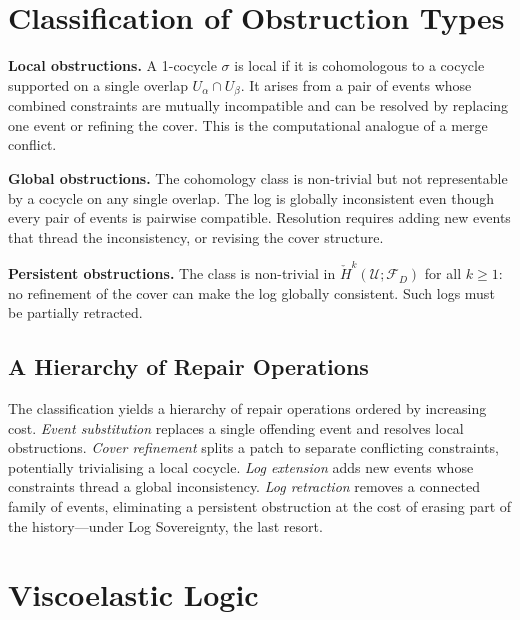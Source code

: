 \documentclass[12pt,oneside]{article}
\theoremstyle{plain}
\theoremstyle{definition}
\theoremstyle{remark}
\newcommand{\Sh}{\mathcal{F}}
\newcommand{\D}{D}
\newcommand{\Hcheck}{\check{H}}
\begin{document}
\section{Classification of Obstruction Types}
\label{sec:classification}

\noindent\textbf{Local obstructions.} A 1-cocycle $\sigma$ is local if it is
cohomologous to a cocycle supported on a single overlap $U_\alpha \cap U_\beta$.
It arises from a pair of events whose combined constraints are mutually
incompatible and can be resolved by replacing one event or refining the cover.
This is the computational analogue of a merge conflict.

\medskip\noindent\textbf{Global obstructions.} The cohomology class is
non-trivial but not representable by a cocycle on any single overlap. The log is
globally inconsistent even though every pair of events is pairwise compatible.
Resolution requires adding new events that thread the inconsistency, or revising
the cover structure.

\medskip\noindent\textbf{Persistent obstructions.} The class is non-trivial in
$\Hcheck^k(\mathcal{U};\Sh_\D)$ for all $k \geq 1$: no refinement of the cover
can make the log globally consistent. Such logs must be partially retracted.

\subsection{A Hierarchy of Repair Operations}

The classification yields a hierarchy of repair operations ordered by increasing
cost. \emph{Event substitution} replaces a single offending event and resolves
local obstructions. \emph{Cover refinement} splits a patch to separate
conflicting constraints, potentially trivialising a local cocycle. \emph{Log
extension} adds new events whose constraints thread a global inconsistency.
\emph{Log retraction} removes a connected family of events, eliminating a
persistent obstruction at the cost of erasing part of the history---under Log
Sovereignty, the last resort.

\section{Viscoelastic Logic}
\label{sec:viscoelastic}
\end{document}
